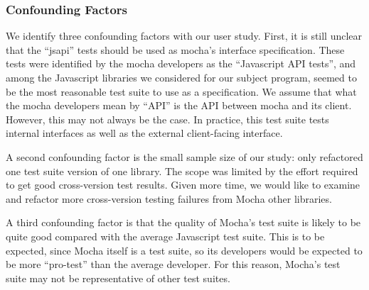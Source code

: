 \subsubsection{Confounding Factors}
We identify three confounding factors with our user study. First, it
is still unclear that the ``jsapi'' tests should be used as mocha's
interface specification. These tests were identified by the mocha
developers as the ``Javascript API tests'', and among the Javascript
libraries we considered for our subject program, seemed to be the most
reasonable test suite to use as a specification. We assume that what
the mocha developers mean by ``API'' is the API between mocha and its
client. However, this may not always be the case. In practice, this
test suite tests internal interfaces as well as the external
client-facing interface.

A second confounding factor is the small sample size of our study:
only refactored one test suite version of one library. The scope was
limited by the effort required to get good cross-version test
results. Given more time, we would like to examine and refactor more
cross-version testing failures from Mocha other libraries.

A third confounding factor is that the quality of Mocha's test suite
is likely to be quite good compared with the average Javascript test
suite. This is to be expected, since Mocha itself is a test suite, so
its developers would be expected to be more ``pro-test'' than the
average developer. For this reason, Mocha's test suite may not be
representative of other test suites.


